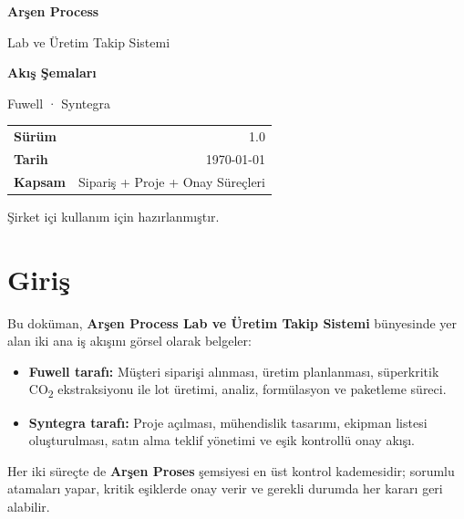 \documentclass[11pt,a4paper]{article}
\begin{document}
\begin{titlepage}
\centering
\vspace*{3cm}
{\Huge\bfseries\color{slate} Arşen Process \par}
\vspace{0.4cm}
{\LARGE\color{accent} Lab ve Üretim Takip Sistemi \par}
\vspace{2cm}
{\Large\bfseries Akış Şemaları \par}
\vspace{0.3cm}
{\large\color{slate} Fuwell · Syntegra \par}
\vspace{3cm}
\begin{tabularx}{0.7\textwidth}{Xr}
\toprule
\textbf{Sürüm} & 1.0 \\
\textbf{Tarih} & \today \\
\textbf{Kapsam} & Sipariş + Proje + Onay Süreçleri \\
\bottomrule
\end{tabularx}
\vfill
{\small\color{slate}Şirket içi kullanım için hazırlanmıştır.}
\end{titlepage}

\tableofcontents
\newpage

\section{Giriş}

Bu doküman, \textbf{Arşen Process Lab ve Üretim Takip Sistemi} bünyesinde yer alan
iki ana iş akışını görsel olarak belgeler:

\begin{itemize}
  \item \textbf{Fuwell tarafı:} Müşteri siparişi alınması, üretim planlanması,
        süperkritik CO\textsubscript{2} ekstraksiyonu ile lot üretimi, analiz,
        formülasyon ve paketleme süreci.
  \item \textbf{Syntegra tarafı:} Proje açılması, mühendislik tasarımı, ekipman
        listesi oluşturulması, satın alma teklif yönetimi ve eşik kontrollü onay
        akışı.
\end{itemize}

Her iki süreçte de \textbf{Arşen Proses} şemsiyesi en üst kontrol kademesidir;
sorumlu atamaları yapar, kritik eşiklerde onay verir ve gerekli durumda her
kararı geri alabilir.
\end{document}
